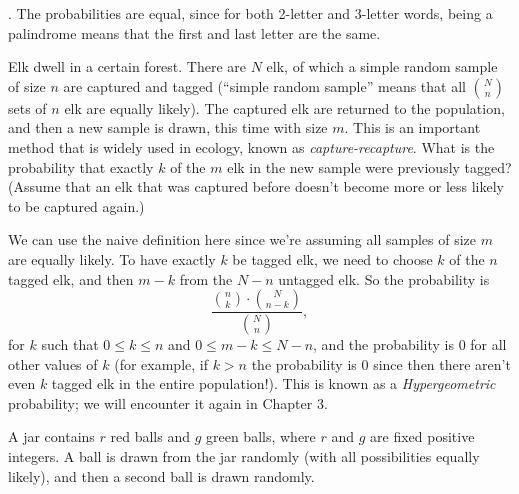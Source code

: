 {\begin{Solution}
{            \item 
            \smash{\boxed{=}}. 
            The probabilities are equal, since for both 2-letter and 3-letter words, being a palindrome means that the first and last letter are the same. 
        }
    \end{Solution}
    \item%
    \item%
    \oS Elk dwell in a certain forest. 
    There are $N$ elk, of which a simple random sample of size $n$ are captured and tagged (``simple random sample'' means that all $\binom{N}{n}$ sets of $n$ elk are equally likely). 
    The captured elk are returned to the population, and then a new sample is drawn, this time with size $m$. 
    This is an important method that is widely used in ecology, known as \textit{capture-recapture}. 
    What is the probability that exactly $k$ of the $m$ elk in the new sample were previously tagged? 
    (Assume that an elk that was captured before doesn't become more or less likely to be captured again.) 
    \begin{Solution}
        We can use the naive definition here since we're assuming all samples of size $m$ are equally likely. 
        To have exactly $k$ be tagged elk, we need to choose $k$ of the $n$ tagged elk, and then $m - k$ from the $N - n$ untagged elk. 
        So the probability is 
        \begin{equation*}
            \frac{\binom{n}{k} \cdot \binom{N}{n-k}}{\binom{N}{n}}, 
        \end{equation*}
        for $k$ such that $0 \leq k \leq n$ and $0 \leq m - k \leq N - n$, and the probability is 0 for all other values of $k$ (for example, if $k > n$ the probability is 0 since then there aren't even $k$ tagged elk in the entire population!). 
        This is known as a \textit{Hypergeometric} probability; we will encounter it again in Chapter 3. 
    \end{Solution}
    \item%
    \item%
    \oS A jar contains $r$ red balls and $g$ green balls, where $r$ and $g$ are fixed positive integers. 
    A ball is drawn from the jar randomly (with all possibilities equally likely), and then a second ball is drawn randomly. 
    }
